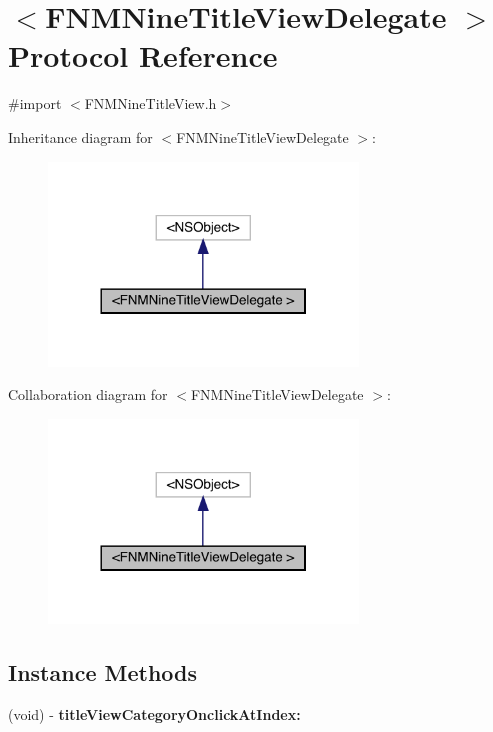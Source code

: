 \hypertarget{protocol_f_n_m_nine_title_view_delegate_01-p}{}\section{$<$F\+N\+M\+Nine\+Title\+View\+Delegate $>$ Protocol Reference}
\label{protocol_f_n_m_nine_title_view_delegate_01-p}


{\ttfamily \#import $<$F\+N\+M\+Nine\+Title\+View.\+h$>$}



Inheritance diagram for $<$F\+N\+M\+Nine\+Title\+View\+Delegate $>$\+:\nopagebreak
\begin{figure}[H]
\begin{center}
\leavevmode
\includegraphics[width=233pt]{protocol_f_n_m_nine_title_view_delegate_01-p__inherit__graph}
\end{center}
\end{figure}


Collaboration diagram for $<$F\+N\+M\+Nine\+Title\+View\+Delegate $>$\+:\nopagebreak
\begin{figure}[H]
\begin{center}
\leavevmode
\includegraphics[width=233pt]{protocol_f_n_m_nine_title_view_delegate_01-p__coll__graph}
\end{center}
\end{figure}
\subsection*{Instance Methods}
\begin{DoxyCompactItemize}
\item 
\mbox{\label{protocol_f_n_m_nine_title_view_delegate_01-p_af159ef796a7f17817f3fd0e245bacdef}} 
(void) -\/ {\bfseries title\+View\+Category\+Onclick\+At\+Index\+:}
\end{DoxyCompactItemize}


